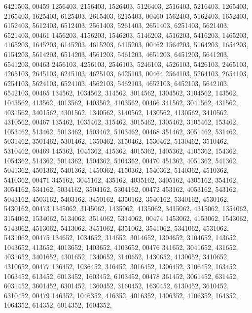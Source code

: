 \begin{DoxyCode}
      6421503,
00459       1256403, 2156403, 1526403, 5126403, 2516403, 5216403, 1265403, 2165403, 1625403, 6125403, 2615403, 
      6215403,
00460       1562403, 5162403, 1652403, 6152403, 5612403, 6512403, 2561403, 5261403, 2651403, 6251403, 5621403, 
      6521403,
00461       1456203, 4156203, 1546203, 5146203, 4516203, 5416203, 1465203, 4165203, 1645203, 6145203, 4615203, 
      6415203,
00462       1564203, 5164203, 1654203, 6154203, 5614203, 6514203, 4561203, 5461203, 4651203, 6451203, 5641203, 
      6541203,
00463       2456103, 4256103, 2546103, 5246103, 4526103, 5426103, 2465103, 4265103, 2645103, 6245103, 4625103, 
      6425103,
00464       2564103, 5264103, 2654103, 6254103, 5624103, 6524103, 4562103, 5462103, 4652103, 6452103, 5642103, 
      6542103,
00465        134562, 1034562,  314562, 3014562, 1304562, 3104562,  143562, 1043562,  413562, 4013562, 1403562, 
      4103562,
00466        341562, 3041562,  431562, 4031562, 3401562, 4301562, 1340562, 3140562, 1430562, 4130562, 3410562, 
      4310562,
00467        135462, 1035462,  315462, 3015462, 1305462, 3105462,  153462, 1053462,  513462, 5013462, 1503462, 
      5103462,
00468        351462, 3051462,  531462, 5031462, 3501462, 5301462, 1350462, 3150462, 1530462, 5130462, 3510462, 
      5310462,
00469        145362, 1045362,  415362, 4015362, 1405362, 4105362,  154362, 1054362,  514362, 5014362, 1504362, 
      5104362,
00470        451362, 4051362,  541362, 5041362, 4501362, 5401362, 1450362, 4150362, 1540362, 5140362, 4510362, 
      5410362,
00471        345162, 3045162,  435162, 4035162, 3405162, 4305162,  354162, 3054162,  534162, 5034162, 3504162, 
      5304162,
00472        453162, 4053162,  543162, 5043162, 4503162, 5403162, 3450162, 4350162, 3540162, 5340162, 4530162, 
      5430162,
00473       1345062, 3145062, 1435062, 4135062, 3415062, 4315062, 1354062, 3154062, 1534062, 5134062, 3514062, 
      5314062,
00474       1453062, 4153062, 1543062, 5143062, 4513062, 5413062, 3451062, 4351062, 3541062, 5341062, 4531062, 
      5431062,
00475        134652, 1034652,  314652, 3014652, 1304652, 3104652,  143652, 1043652,  413652, 4013652, 1403652, 
      4103652,
00476        341652, 3041652,  431652, 4031652, 3401652, 4301652, 1340652, 3140652, 1430652, 4130652, 3410652, 
      4310652,
00477        136452, 1036452,  316452, 3016452, 1306452, 3106452,  163452, 1063452,  613452, 6013452, 1603452, 
      6103452,
00478        361452, 3061452,  631452, 6031452, 3601452, 6301452, 1360452, 3160452, 1630452, 6130452, 3610452, 
      6310452,
00479        146352, 1046352,  416352, 4016352, 1406352, 4106352,  164352, 1064352,  614352, 6014352, 1604352, 

\end{DoxyCode}
